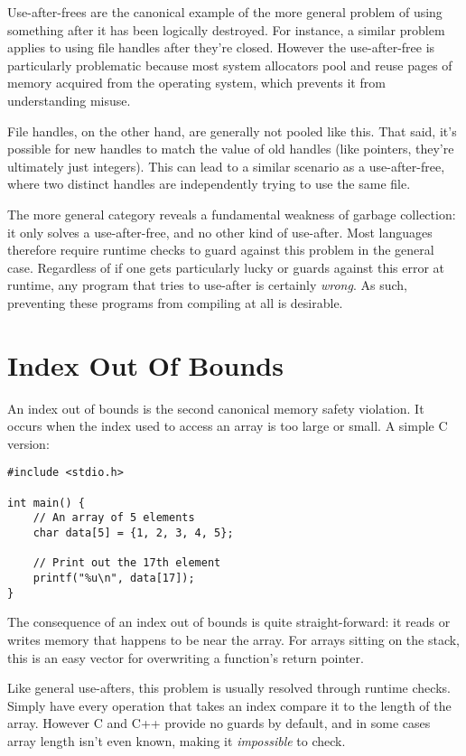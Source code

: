 Use-after-frees are the canonical example of the more general problem of
using something after it has been logically destroyed. For instance, a similar
problem applies to using file handles after they're closed. However the
use-after-free is particularly problematic because most system allocators
pool and reuse pages of memory acquired from the operating system, which prevents
it from understanding misuse.

File handles, on the other hand, are generally not pooled like this. That said,
it's possible for new handles to match the value of old handles
(like pointers, they're ultimately just integers). This can lead to a similar
scenario as a use-after-free, where two distinct handles are independently
trying to use the same file.

The more general category reveals a fundamental weakness of garbage collection:
it only solves a use-after-free, and no other kind of use-after. Most languages
therefore require runtime checks to guard against this problem in the general
case. Regardless of if one gets particularly lucky or guards against this error
at runtime, any program that tries to use-after is certainly \emph{wrong}. As
such, preventing these programs from compiling at all is desirable.




\section{Index Out Of Bounds}

An index out of bounds is the second canonical memory safety violation. It
occurs when the index used to access an array is too large or small. A simple
C version:

\begin{verbatim}
#include <stdio.h>

int main() {
    // An array of 5 elements
    char data[5] = {1, 2, 3, 4, 5};

    // Print out the 17th element
    printf("%u\n", data[17]);
}
\end{verbatim}

The consequence of an index out of bounds is quite straight-forward: it reads
or writes memory that happens to be near the array. For arrays sitting on the
stack, this is an easy vector for overwriting a function's return pointer.

Like general use-afters, this problem is usually resolved through runtime
checks. Simply have every operation that takes an index compare it to the length of the
array. However C and C++ provide no guards by default, and in some cases array
length isn't even known, making it \emph{impossible} to check.





